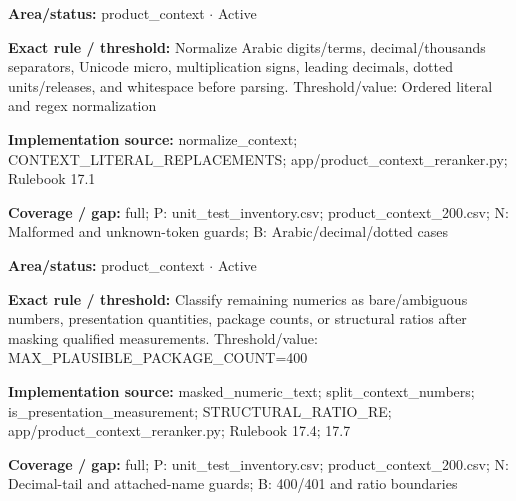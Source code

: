 \begin{tcolorbox}[enhanced,breakable,colback=white,colframe=Muted!45,boxrule=0.45pt,arc=1.5pt,left=6pt,right=6pt,top=5pt,bottom=5pt,title={\texttt{PC-NORMALIZE-01}},title after break={\texttt{PC-NORMALIZE-01}\ (continued)},fonttitle=\headingfont\bfseries\color{Navy},coltitle=Navy]
\textbf{Area/status:} product\_\allowbreak{}context $\boldsymbol{\cdot}$ Active\par
\smallskip
\textbf{Exact rule / threshold:} Normalize Arabic digits/\allowbreak{}terms, decimal/\allowbreak{}thousands separators, Unicode micro, multiplication signs, leading decimals, dotted units/\allowbreak{}releases, and whitespace before parsing. Threshold/\allowbreak{}value: Ordered literal and regex normalization\par
\smallskip
\textbf{Implementation source:} normalize\_\allowbreak{}context; CONTEXT\_\allowbreak{}LITERAL\_\allowbreak{}REPLACEMENTS; app/\allowbreak{}product\_\allowbreak{}context\_\allowbreak{}reranker.py; Rulebook 17.1\par
\smallskip
\textbf{Coverage / gap:} full; P: unit\_\allowbreak{}test\_\allowbreak{}inventory.csv; product\_\allowbreak{}context\_\allowbreak{}200.csv; N: Malformed and unknown-token guards; B: Arabic/\allowbreak{}decimal/\allowbreak{}dotted cases
\end{tcolorbox}
\begin{tcolorbox}[enhanced,breakable,colback=white,colframe=Muted!45,boxrule=0.45pt,arc=1.5pt,left=6pt,right=6pt,top=5pt,bottom=5pt,title={\texttt{PC-NUMBER-CLASS-05}},title after break={\texttt{PC-NUMBER-CLASS-05}\ (continued)},fonttitle=\headingfont\bfseries\color{Navy},coltitle=Navy]
\textbf{Area/status:} product\_\allowbreak{}context $\boldsymbol{\cdot}$ Active\par
\smallskip
\textbf{Exact rule / threshold:} Classify remaining numerics as bare/\allowbreak{}ambiguous numbers, presentation quantities, package counts, or structural ratios after masking qualified measurements. Threshold/\allowbreak{}value: MAX\_\allowbreak{}PLAUSIBLE\_\allowbreak{}PACKAGE\_\allowbreak{}COUNT=400\par
\smallskip
\textbf{Implementation source:} masked\_\allowbreak{}numeric\_\allowbreak{}text; split\_\allowbreak{}context\_\allowbreak{}numbers; is\_\allowbreak{}presentation\_\allowbreak{}measurement; STRUCTURAL\_\allowbreak{}RATIO\_\allowbreak{}RE; app/\allowbreak{}product\_\allowbreak{}context\_\allowbreak{}reranker.py; Rulebook 17.4; 17.7\par
\smallskip
\textbf{Coverage / gap:} full; P: unit\_\allowbreak{}test\_\allowbreak{}inventory.csv; product\_\allowbreak{}context\_\allowbreak{}200.csv; N: Decimal-tail and attached-name guards; B: 400/\allowbreak{}401 and ratio boundaries
\end{tcolorbox}
